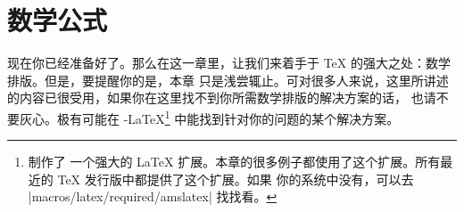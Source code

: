 
\chapter{数学公式}

\begin{intro}
现在你已经准备好了。那么在这一章里，让我们来着手于 \TeX{} 的强大之处：数学排版。但是，要提醒你的是，本章
只是浅尝辄止。可对很多人来说，这里所讲述的内容已很受用，如果你在这里找不到你所需数学排版的解决方案的话，
也请不要灰心。极有可能在 \AmS-\LaTeX{}\footnote{ 制作了
一个强大的 \LaTeX{} 扩展。本章的很多例子都使用了这个扩展。所有最近的 \TeX{} 发行版中都提供了这个扩展。如果
你的系统中没有，可以去 \CTANref|macros/latex/required/amslatex| 找找看。} 中能找到针对你的问题的某个解决方案。


\end{intro}


